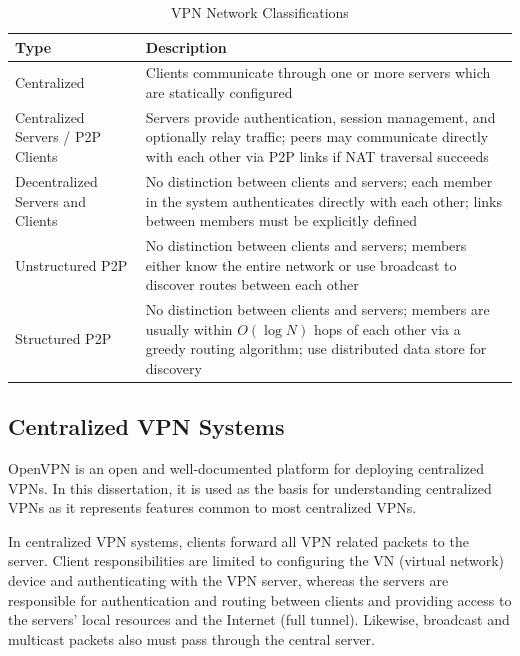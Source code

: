 \begin{center}
\begin{table}
\caption{VPN Network Classifications}
\label{tab:vpn_types}
\begin{tabular}{p{1.5in}p{4.5in}} \hline
Type & Description \\ \hline \hline
Centralized & Clients communicate through one or more servers which are statically
configured \\ \hline
Centralized Servers / P2P Clients & Servers provide authentication, session management, and
optionally relay traffic; peers may communicate directly with each
other via P2P links if NAT traversal succeeds\\ \hline
Decentralized Servers and Clients & No distinction between clients and servers;
each member in the system authenticates directly with each other; links between
members must be explicitly defined \\ \hline
Unstructured P2P & No distinction between clients and servers; members either know
the entire network or use broadcast to discover routes between each other \\ \hline
Structured P2P & No distinction between clients and servers; members are usually
within $O(\log N)$ hops of each other via a greedy routing algorithm; use
distributed data store for discovery \\ \hline
\end{tabular}
\end{table}
\end{center}


\subsection{Centralized VPN Systems}

OpenVPN is an open and well-documented platform for deploying centralized VPNs.
In this dissertation, it is used as the basis for understanding centralized
VPNs as it represents features common to most centralized VPNs.

In centralized VPN systems, clients forward all VPN related packets to the
server.  Client responsibilities are limited to configuring the VN (virtual
network) device and authenticating with the VPN server, whereas the servers are
responsible for authentication and routing between clients and providing access
to the servers' local resources and the Internet (full tunnel).  Likewise,
broadcast and multicast packets also must pass through the central server.

